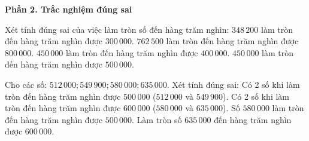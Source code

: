 \textbf{Phần 2. Trắc nghiệm đúng sai}

\begin{ex} %
Xét tính đúng sai của việc làm tròn số đến hàng trăm nghìn:
\choiceTF
{\True $348\,200$ làm tròn đến hàng trăm nghìn được $300\,000$.}
{\True $762\,500$ làm tròn đến hàng trăm nghìn được $800\,000$.}
{$450\,000$ làm tròn đến hàng trăm nghìn được $400\,000$.}
{\True $450\,000$ làm tròn đến hàng trăm nghìn được $500\,000$.}
\end{ex}

\begin{ex} %
Cho các số: $512\,000; 549\,900; 580\,000; 635\,000$. Xét tính đúng sai:
\choiceTF
{\True Có 2 số khi làm tròn đến hàng trăm nghìn được $500\,000$ ($512\,000$ và $549\,900$).}
{\True Có 2 số khi làm tròn đến hàng trăm nghìn được $600\,000$ ($580\,000$ và $635\,000$).}
{Số $580\,000$ làm tròn đến hàng trăm nghìn được $500\,000$.}
{\True Làm tròn số $635\,000$ đến hàng trăm nghìn được $600\,000$.}
\end{ex}

